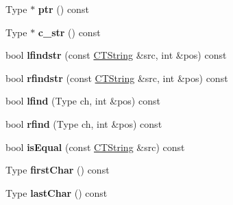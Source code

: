 \begin{DoxyCompactItemize}
\item 
\hypertarget{classps_1_1base_1_1CTString_a4922602c8074fb93bd440900ec2a617d}{}Type $\ast$ {\bfseries ptr} () const \label{classps_1_1base_1_1CTString_a4922602c8074fb93bd440900ec2a617d}

\item 
\hypertarget{classps_1_1base_1_1CTString_ac5350520ea1280040d42ba81b230b7b1}{}Type $\ast$ {\bfseries c\+\_\+str} () const \label{classps_1_1base_1_1CTString_ac5350520ea1280040d42ba81b230b7b1}

\item 
\hypertarget{classps_1_1base_1_1CTString_af6530976f91dcdc018a6650027faae8d}{}bool {\bfseries lfindstr} (const \hyperlink{classps_1_1base_1_1CTString}{C\+T\+String} \&src, int \&pos) const \label{classps_1_1base_1_1CTString_af6530976f91dcdc018a6650027faae8d}

\item 
\hypertarget{classps_1_1base_1_1CTString_a82af1c81725e0f6cfb64767efa2b5942}{}bool {\bfseries rfindstr} (const \hyperlink{classps_1_1base_1_1CTString}{C\+T\+String} \&src, int \&pos) const \label{classps_1_1base_1_1CTString_a82af1c81725e0f6cfb64767efa2b5942}

\item 
\hypertarget{classps_1_1base_1_1CTString_ae211e362623a2c2de344e6b5b18b46fd}{}bool {\bfseries lfind} (Type ch, int \&pos) const \label{classps_1_1base_1_1CTString_ae211e362623a2c2de344e6b5b18b46fd}

\item 
\hypertarget{classps_1_1base_1_1CTString_a0df6c531504952116610d18ce517476e}{}bool {\bfseries rfind} (Type ch, int \&pos) const \label{classps_1_1base_1_1CTString_a0df6c531504952116610d18ce517476e}

\item 
\hypertarget{classps_1_1base_1_1CTString_a44c32219e6162f115b5def5feb618d95}{}bool {\bfseries is\+Equal} (const \hyperlink{classps_1_1base_1_1CTString}{C\+T\+String} \&src) const \label{classps_1_1base_1_1CTString_a44c32219e6162f115b5def5feb618d95}

\item 
\hypertarget{classps_1_1base_1_1CTString_a4e0b5ac9b5a7929b6989ebac7e055ae9}{}Type {\bfseries first\+Char} () const \label{classps_1_1base_1_1CTString_a4e0b5ac9b5a7929b6989ebac7e055ae9}

\item 
\hypertarget{classps_1_1base_1_1CTString_a4df6199f56a6230800687b72f01aa77c}{}Type {\bfseries last\+Char} () const \label{classps_1_1base_1_1CTString_a4df6199f56a6230800687b72f01aa77c}


\end{DoxyCompactItemize}
